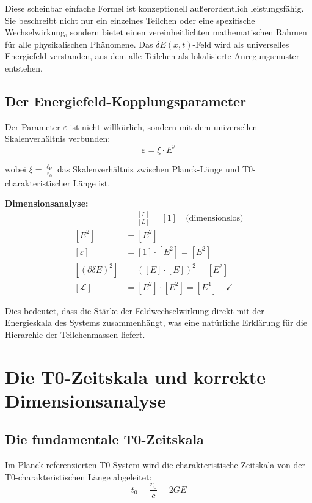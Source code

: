 \documentclass[12pt,a4paper]{report}
\newcommand{\lP}{\ell_{\text{P}}}         %
\newcommand{\rzero}{r_0}                  %
\newcommand{\tzero}{t_0}                  %
\begin{document}
	Diese scheinbar einfache Formel ist konzeptionell außerordentlich leistungsfähig. Sie beschreibt nicht nur ein einzelnes Teilchen oder eine spezifische Wechselwirkung, sondern bietet einen vereinheitlichten mathematischen Rahmen für alle physikalischen Phänomene. Das $\delta E(x,t)$-Feld wird als universelles Energiefeld verstanden, aus dem alle Teilchen als lokalisierte Anregungsmuster entstehen.
	
	\subsection{Der Energiefeld-Kopplungsparameter}
	
	Der Parameter $\varepsilon$ ist nicht willkürlich, sondern mit dem universellen Skalenverhältnis verbunden:
	\begin{equation}
		\varepsilon = \xi \cdot E^2
		\label{eq:energy_coupling}
	\end{equation}
	
	wobei $\xi = \frac{\lP}{\rzero}$ das Skalenverhältnis zwischen Planck-Länge und T0-charakteristischer Länge ist.
	
	\textbf{Dimensionsanalyse:}
	\begin{align}
		[\xi] &= \frac{[L]}{[L]} = [1] \quad \text{(dimensionslos)} \\
		[E^2] &= [E^2] \\
		[\varepsilon] &= [1] \cdot [E^2] = [E^2] \\
		[(\partial\delta E)^2] &= ([E] \cdot [E])^2 = [E^2] \\
		[\mathcal{L}] &= [E^2] \cdot [E^2] = [E^4] \quad \checkmark
	\end{align}
	
	Dies bedeutet, dass die Stärke der Feldwechselwirkung direkt mit der Energieskala des Systems zusammenhängt, was eine natürliche Erklärung für die Hierarchie der Teilchenmassen liefert.
	
	\section{Die T0-Zeitskala und korrekte Dimensionsanalyse}
	
	\subsection{Die fundamentale T0-Zeitskala}
	
	Im Planck-referenzierten T0-System wird die charakteristische Zeitskala von der T0-charakteristischen Länge abgeleitet:
	\begin{equation}
		\boxed{\tzero = \frac{\rzero}{c} = 2GE}
		\label{eq:t0_time}
	\end{equation}
	
\end{document}
